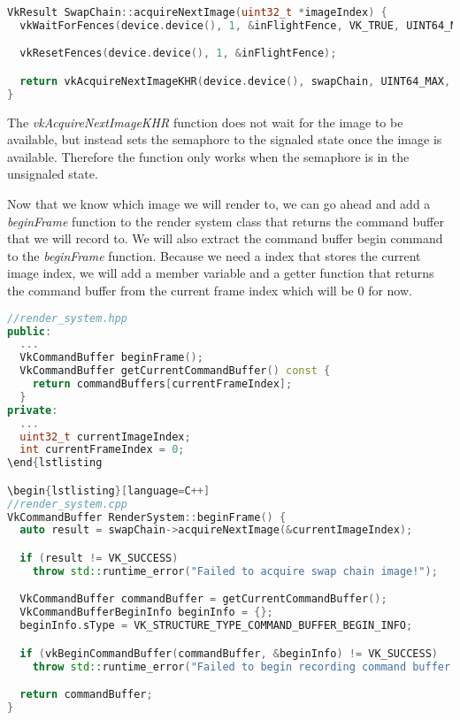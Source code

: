 \documentclass[12pt]{report} \usepackage{preamble}
\begin{document}
\begin{lstlisting}[language=C++]
VkResult SwapChain::acquireNextImage(uint32_t *imageIndex) {
  vkWaitForFences(device.device(), 1, &inFlightFence, VK_TRUE, UINT64_MAX);

  vkResetFences(device.device(), 1, &inFlightFence);

  return vkAcquireNextImageKHR(device.device(), swapChain, UINT64_MAX, imageAvailableSemaphore, VK_NULL_HANDLE, imageIndex);
}
\end{lstlisting}

The \textit{vkAcquireNextImageKHR} function does not wait for the image to be available, but instead sets the semaphore to the signaled state
once the image is available. Therefore the function only works when the semaphore is in the unsignaled state.

Now that we know which image we will render to, we can go ahead and add a \textit{beginFrame} function to the render system class that
returns the command buffer that we will record to. We will also extract the command buffer begin command to the \textit{beginFrame}
function. Because we need a index that stores the current image index, we will add a member variable
and a getter function that returns the command buffer from the current frame index which will be 0 for now.

\begin{lstlisting}[language=C++]
//render_system.hpp
public:
  ...
  VkCommandBuffer beginFrame();
  VkCommandBuffer getCurrentCommandBuffer() const { 
    return commandBuffers[currentFrameIndex]; 
  }
private:
  ...
  uint32_t currentImageIndex;
  int currentFrameIndex = 0;
\end{lstlisting

\begin{lstlisting}[language=C++]
//render_system.cpp
VkCommandBuffer RenderSystem::beginFrame() {
  auto result = swapChain->acquireNextImage(&currentImageIndex);

  if (result != VK_SUCCESS)
    throw std::runtime_error("Failed to acquire swap chain image!");

  VkCommandBuffer commandBuffer = getCurrentCommandBuffer();
  VkCommandBufferBeginInfo beginInfo = {};
  beginInfo.sType = VK_STRUCTURE_TYPE_COMMAND_BUFFER_BEGIN_INFO;

  if (vkBeginCommandBuffer(commandBuffer, &beginInfo) != VK_SUCCESS)
    throw std::runtime_error("Failed to begin recording command buffer!");

  return commandBuffer;
}
\end{lstlisting}
\end{document}
